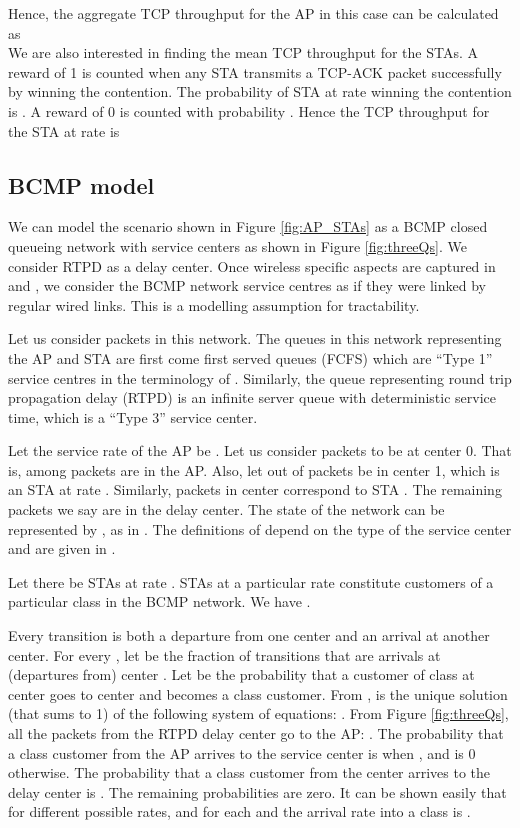 \documentclass[conference]{IEEEtran}
\begin{document}
Hence, the aggregate TCP throughput for the AP in this case can be 
calculated as\\

We are also interested in finding the mean TCP throughput for the STAs. A
reward of 1 is counted when any STA transmits a TCP-ACK packet successfully by
winning the contention. The probability of STA at rate  winning the
contention is . A reward of 0 is
counted with probability .
Hence the TCP throughput for the STA at rate  is\\



\subsection{BCMP model}
We can model the scenario shown in Figure \ref{fig:AP_STAs} as a BCMP closed
queueing network \cite{astn_model:bcmp} with service centers as shown in Figure 
\ref{fig:threeQs}. We consider RTPD as a delay center. Once wireless specific 
aspects are captured in  and ,
we consider the BCMP network service centres as if they were linked
by regular wired links. This is a modelling assumption for tractability.

Let us consider  packets in this network. The queues in this network 
representing the AP and STA are first come first served queues (FCFS) which 
are ``Type 1'' service centres in the terminology of \cite{astn_model:bcmp}. 
Similarly, the queue representing round trip propagation delay (RTPD) is an 
infinite server queue with deterministic service time, which is a ``Type 3'' service center.

Let the service rate of the AP be . Let us consider  packets to
be at center 0. That is,  among  packets are in the AP. Also, let 
 out of  packets be in center 1, which is an STA at rate  .
Similarly,  packets in center correspond to STA . The remaining 
packets we say  are in the delay center. The state of the network 
can be represented by ,
as in \cite{astn_model:bcmp}. The definitions of  depend on the type of the service center   and are given in \cite{astn_model:bcmp}.

Let there be  STAs at rate . STAs at a particular rate constitute
 customers of a particular class in the BCMP network. We have .

Every transition is both a departure from one center and an arrival at another 
center. For every , let  be the fraction of transitions that are
arrivals at (departures from) center . Let   be the 
probability that a customer of class  at center   goes to  center  
and becomes a class  customer. From \cite{astn_model:Wolff},   is the
unique solution (that sums to 1) of the following system of equations:
. 
From Figure \ref{fig:threeQs}, all the packets from the RTPD delay center go
to the AP: . The probability that a  class customer from the
AP arrives to the  service center is  when , and is 0 otherwise. 
The probability that a  class customer from  the  center arrives
to the delay center is . The remaining probabilities are zero. 
It can be shown easily that for  different possible rates,
 and  for each  and  the arrival rate into a class  is .
\end{document}
